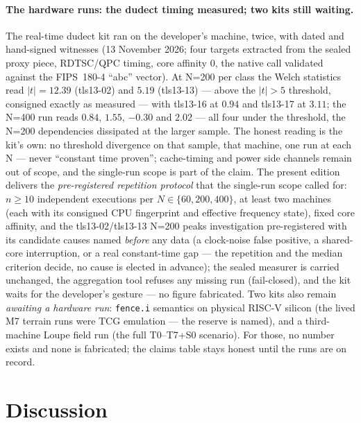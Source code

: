 \documentclass[11pt,a4paper]{article}
\newcommand{\code}[1]{\texttt{\small #1}}
\begin{document}
\paragraph{The hardware runs: the dudect timing measured; two kits still
waiting.} The real-time dudect kit ran on the developer's machine,
twice, with dated and hand-signed witnesses (13 November 2026; four
targets extracted from the sealed proxy piece, RDTSC/QPC timing, core
affinity 0, the native call validated against the FIPS~180-4 ``abc''
vector). At N=200 per class the Welch statistics read $|t| = 12.39$
(tls13-02) and $5.19$ (tls13-13) --- above the $|t|>5$ threshold,
consigned exactly as measured --- with tls13-16 at $0.94$ and tls13-17
at $3.11$; the N=400 run reads $0.84$, $1.55$, $-0.30$ and $2.02$ ---
all four under the threshold, the N=200 dependencies dissipated at the
larger sample. The honest reading is the kit's own: no threshold
divergence on that sample, that machine, one run at each N --- never
``constant time proven''; cache-timing and power side channels remain
out of scope, and the single-run scope is part of the claim. The present edition
delivers the \emph{pre-registered repetition protocol} that the
single-run scope called for: $n{\ge}10$ independent executions per
$N{\in}\{60, 200, 400\}$, at least two machines (each with its
consigned CPU fingerprint and effective frequency state), fixed core
affinity, and the tls13-02/tls13-13 N=200 peaks investigation
pre-registered with its candidate causes named \emph{before} any data
(a clock-noise false positive, a shared-core interruption, or a real
constant-time gap --- the repetition and the median criterion decide,
no cause is elected in advance); the sealed measurer is carried
unchanged, the aggregation tool refuses any missing run (fail-closed),
and the kit waits for the developer's gesture --- no figure fabricated.
Two kits also remain \emph{awaiting a hardware run}:
\code{fence.i} semantics on physical RISC-V silicon (the lived M7
terrain runs were TCG emulation --- the reserve is named), and a
third-machine Loupe field run (the full T0--T7+S0 scenario). For
those, no number exists and none is fabricated; the claims table stays
honest until the runs are on record.



\section{Discussion}\label{sec:discussion}
\end{document}

